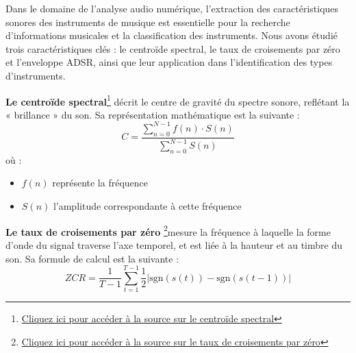 Dans le domaine de l'analyse audio numérique, l'extraction des caractéristiques sonores des instruments de musique est essentielle pour la recherche d'informations musicales et la classification des instruments. Nous avons étudié trois caractéristiques clés : le centroïde spectral, le taux de croisements par zéro et l'enveloppe ADSR, ainsi que leur application dans l'identification des types d'instruments.

\textbf{Le centroïde spectral}\footnote{\href{https://en.wikipedia.org/wiki/Spectral_centroid}{Cliquez ici pour accéder à la source sur le centroïde spectral}} décrit le centre de gravité du spectre sonore, reflétant la « brillance » du son. Sa représentation mathématique est la suivante : 
\begin{equation}
    C = \frac{\sum_{n=0}^{N-1}f(n)\cdot S(n)}{\sum_{n=0}^{N-1}S(n)} 
\end{equation}
où :
\begin{itemize}
    \item \(f(n)\) représente la fréquence
    \item \(S(n)\) l'amplitude correspondante à cette fréquence
\end{itemize}

\textbf{Le taux de croisements par zéro} \footnote{\href{https://en.wikipedia.org/wiki/Zero-crossing_rate}{Cliquez ici pour accéder à la source sur le taux de croisements par zéro}}mesure la fréquence à laquelle la forme d'onde du signal traverse l'axe temporel, et est liée à la hauteur et au timbre du son. Sa formule de calcul est la suivante :
\begin{equation}
    ZCR = \frac{1}{T-1}\sum_{t=1}^{T-1}\frac{1}{2}|\text{sgn}(s(t))-\text{sgn}(s(t-1))|
\end{equation}

